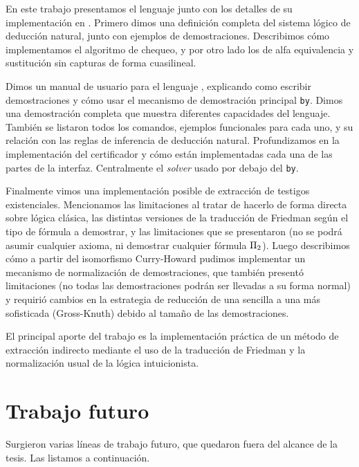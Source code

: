 En este trabajo presentamos el lenguaje \ppaLang{} junto con los detalles de su
implementación en \ppaTool{}. Primero dimos una definición completa del sistema
lógico de deducción natural, junto con ejemplos de demostraciones. Describimos
cómo implementamos el algoritmo de chequeo, y por otro lado los de
alfa equivalencia y sustitución sin capturas de forma cuasilineal.

Dimos un manual de usuario para el lenguaje \ppaLang{}, explicando como
escribir demostraciones y cómo usar el mecanismo de demostración principal
\lstinline{by}. Dimos una demostración completa que muestra diferentes capacidades del lenguaje. También se listaron
todos los comandos, ejemplos funcionales para cada uno, y su relación con las
reglas de inferencia de deducción natural. Profundizamos en la implementación
del certificador y cómo están implementadas cada una de las partes de la
interfaz. Centralmente el \textit{solver} usado por debajo del \lstinline{by}.

Finalmente vimos una implementación posible de extracción de testigos
existenciales. Mencionamos las limitaciones al tratar de hacerlo de forma
directa sobre lógica clásica, las distintas versiones de la traducción de
Friedman según el tipo de fórmula a demostrar, y las limitaciones que se
presentaron (no se podrá asumir cualquier axioma, ni demostrar cualquier fórmula
$\Pi_{2}$). Luego describimos cómo a partir del isomorfismo Curry-Howard
pudimos implementar un mecanismo de normalización de demostraciones, que también
presentó limitaciones (no todas las demostraciones podrán ser llevadas a su
forma normal) y requirió cambios en la estrategia de reducción de una sencilla a
una más sofisticada (Gross-Knuth) debido al tamaño de las demostraciones.

El principal aporte del trabajo es la implementación práctica de un método de
extracción indirecto mediante el uso de la traducción de Friedman y la
normalización usual de la lógica intuicionista.

\section{Trabajo futuro}

Surgieron varias líneas de trabajo futuro, que quedaron fuera del alcance de la
tesis. Las listamos a continuación.

